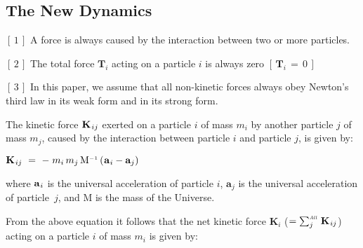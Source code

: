 \documentclass[10pt]{article}
\begin{document}
\par {\centering\subsection*{The New Dynamics}}

\par \bigskip\smallskip \noindent $[\,1\,]$ A force is always caused by the interaction between two or more particles.

\par \bigskip \noindent $[\,2\,]$ The total force ${\mathbf{T}}_i$ acting on a particle $i$ is always zero $[ \, {\mathbf{T}}_i \,=\, 0 \, ]$

\par \bigskip \noindent $[\,3\,]$ In this paper, we assume that all non-kinetic forces always obey Newton's third law in its weak form and in its strong form.

\newpage

\par {}

\par \bigskip\smallskip \noindent The kinetic force ${\mathbf{K}}_{\hspace{+0.060em}ij}$ exerted on a particle $i$ of mass $m_i$ by another particle $j$ of mass $m_j$, caused by the interaction between particle $i$ and particle $j$, is given by:

\par \bigskip ${\mathbf{K}}_{\hspace{+0.060em}ij} ~=~ - \; m_i \, m_j \, {\mathrm{M}}^{\scriptscriptstyle -1} \, (\hspace{+0.045em}{\mathbf{a}}_{\hspace{+0.045em}i} - {\mathbf{a}}_{j})$

\par \bigskip \noindent where ${\mathbf{a}}_{\hspace{+0.045em}i}$ is the universal acceleration of particle $i$, ${\mathbf{a}}_{j}$ is the universal acceleration of \hbox {particle $j$}, and ${\mathrm{M}}$ is the mass of the Universe.

\par \bigskip \noindent From the above equation it follows that the net kinetic force ${\mathbf{K}}_{i}$ (\hspace{+0.237em}$ = \sum_{j}^{\scriptscriptstyle{\mathit{All}}} \, {\mathbf{K}}_{\hspace{+0.060em}ij}$\hspace{+0.237em}) acting on a particle $i$ of mass $m_i$ is given by:
\end{document}
